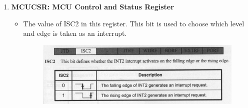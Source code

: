 \documentclass[titlepage, 11pt]{article}
\begin{document}
\begin{enumerate}
    \item \textbf{MCUCSR: MCU Control and Status Register}
        \begin{itemize}
            \item The value of ISC2 in this register. This bit is used to choose which level and edge is taken as an interrupt.
            \begin{figure}[H]
                \centering
                \includegraphics[width=1\linewidth]{MCUCSR.png}
            \end{figure}
        \end{itemize}
\end{enumerate}
\end{document}
